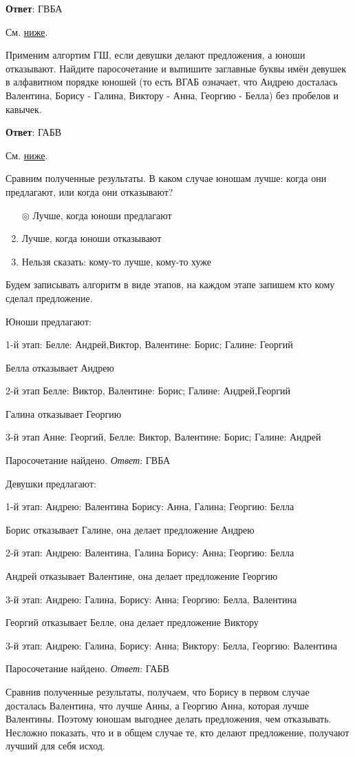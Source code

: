 	\textbf{Ответ}: ГВБА
	
	\solution См. \hyperref[week7-models:train:marriage]{ниже}.
	
	\task
	Применим алгортим ГШ, если девушки делают предложения, а юноши отказывают. Найдите паросочетание и выпишите заглавные буквы имён девушек в алфавитном порядке юношей (то есть ВГАБ означает, что Андрею досталась Валентина, Борису - Галина, Виктору - Анна, Георгию - Белла) без пробелов и кавычек.
	
	\textbf{Ответ}: ГАБВ
	
	\solution См. \hyperref[week7-models:train:marriage]{ниже}.
	
	\task
	Сравним полученные результаты. В каком случае юношам лучше: когда они предлагают, или когда они отказывают?
	\begin{enumerate}[label=$\circ$]
		\item[$\circledcirc$] Лучше, когда юноши предлагают
		\item Лучше, когда юноши отказывают
		\item Нельзя сказать: кому-то лучше, кому-то хуже
	\end{enumerate}

	\solution
	\label{week7-models:train:marriage}
	Будем записывать алгоритм в виде этапов, на каждом этапе запишем кто кому сделал предложение.
	
	Юноши предлагают:
	
	1-й этап: Белле: Андрей,Виктор, Валентине: Борис; Галине: Георгий
	
	Белла отказывает Андрею
	
	2-й этап Белле: Виктор, Валентине: Борис; Галине: Андрей,Георгий
	
	Галина отказывает Георгию
	
	3-й этап Анне: Георгий, Белле: Виктор, Валентине: Борис; Галине: Андрей
	
	Паросочетание найдено. \textit{Ответ}: ГВБА
	
	Девушки предлагают:
	
	1-й этап: Андрею: Валентина Борису: Анна, Галина; Георгию: Белла
	
	Борис отказывает Галине, она делает предложение Андрею
	
	2-й этап: Андрею: Валентина, Галина Борису: Анна; Георгию: Белла
	
	Андрей отказывает Валентине, она делает предложение Георгию
	
	3-й этап: Андрею: Галина, Борису: Анна; Георгию: Белла, Валентина
	
	Георгий отказывает Белле, она делает предложение Виктору
	
	3-й этап: Андрею: Галина, Борису: Анна; Виктору: Белла, Георгию: Валентина
	
	Паросочетание найдено. \textit{Ответ}: ГАБВ
	
	Сравнив полученные результаты, получаем, что Борису в первом случае досталась Валентина, что лучше Анны, а Георгию Анна, которая лучше Валентины. Поэтому юношам выгоднее делать предложения, чем отказывать. Несложно показать, что и в общем случае те, кто делают предложение, получают лучший для себя исход.